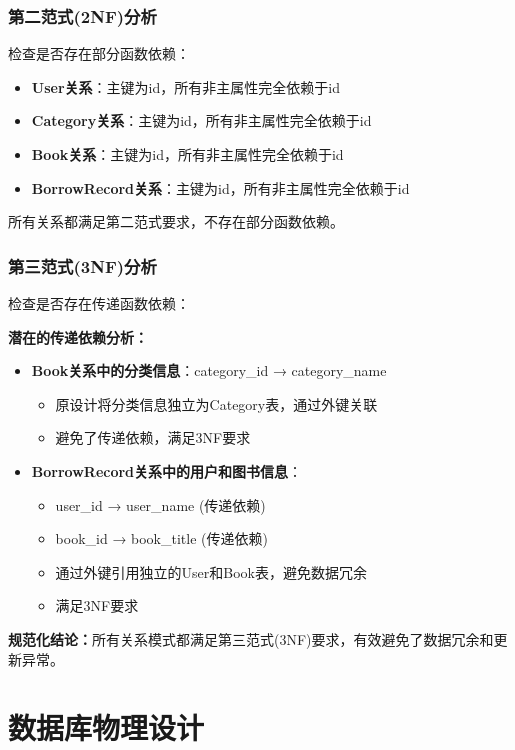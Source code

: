 \documentclass[12pt,a4paper]{article}
\begin{document}
\subsubsection{第二范式(2NF)分析}
检查是否存在部分函数依赖：
\begin{itemize}
    \item \textbf{User关系}：主键为id，所有非主属性完全依赖于id
    \item \textbf{Category关系}：主键为id，所有非主属性完全依赖于id
    \item \textbf{Book关系}：主键为id，所有非主属性完全依赖于id
    \item \textbf{BorrowRecord关系}：主键为id，所有非主属性完全依赖于id
\end{itemize}

所有关系都满足第二范式要求，不存在部分函数依赖。

\subsubsection{第三范式(3NF)分析}
检查是否存在传递函数依赖：

\textbf{潜在的传递依赖分析：}
\begin{itemize}
    \item \textbf{Book关系中的分类信息}：category\_id → category\_name
    \begin{itemize}
        \item 原设计将分类信息独立为Category表，通过外键关联
        \item 避免了传递依赖，满足3NF要求
    \end{itemize}
    
    \item \textbf{BorrowRecord关系中的用户和图书信息}：
    \begin{itemize}
        \item user\_id → user\_name (传递依赖)
        \item book\_id → book\_title (传递依赖)
        \item 通过外键引用独立的User和Book表，避免数据冗余
        \item 满足3NF要求
    \end{itemize}
\end{itemize}

\textbf{规范化结论：}所有关系模式都满足第三范式(3NF)要求，有效避免了数据冗余和更新异常。

\section{数据库物理设计}
\end{document}
